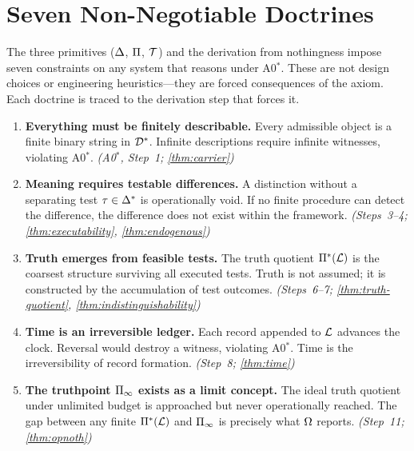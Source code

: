 
\section{Seven Non-Negotiable Doctrines}
\label{sec:doctrines}

The three primitives ($\Delta$, $\Pi$, $\mathcal{T}$) and the derivation from
nothingness impose seven constraints on any system that reasons under A0$^*$.
These are not design choices or engineering heuristics---they are forced
consequences of the axiom.  Each doctrine is traced to the derivation step
that forces it.

\begin{enumerate}[label=\textbf{D\arabic*.}]
  \item \textbf{Everything must be finitely describable.}
        Every admissible object is a finite binary string in $\mathcal{D}^*$.
        Infinite descriptions require infinite witnesses, violating A0$^*$.
        \hfill\emph{(A0$^*$, Step~1; \cref{thm:carrier})}

  \item \textbf{Meaning requires testable differences.}
        A distinction without a separating test $\tau \in \Delta^*$ is
        operationally void.  If no finite procedure can detect the
        difference, the difference does not exist within the framework.
        \hfill\emph{(Steps~3--4; \cref{thm:executability}, \cref{thm:endogenous})}

  \item \textbf{Truth emerges from feasible tests.}
        The truth quotient $\Pi^*(\mathcal{L})$ is the coarsest structure
        surviving all executed tests.  Truth is not assumed; it is
        constructed by the accumulation of test outcomes.
        \hfill\emph{(Steps~6--7; \cref{thm:truth-quotient}, \cref{thm:indistinguishability})}

  \item \textbf{Time is an irreversible ledger.}
        Each record appended to $\mathcal{L}$ advances the clock.  Reversal
        would destroy a witness, violating A0$^*$.  Time is the irreversibility
        of record formation.
        \hfill\emph{(Step~8; \cref{thm:time})}

  \item \textbf{The truthpoint $\Pi_\infty$ exists as a limit concept.}
        The ideal truth quotient under unlimited budget is approached but
        never operationally reached.  The gap between any finite
        $\Pi^*(\mathcal{L})$ and $\Pi_\infty$ is precisely what $\Omega$ reports.
        \hfill\emph{(Step~11; \cref{thm:opnoth})}


\end{enumerate}
